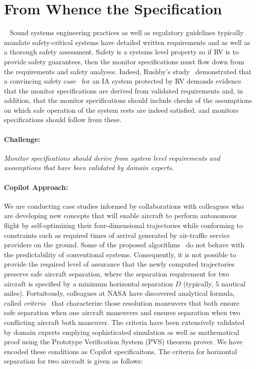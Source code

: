 \section{From Whence the Specification}~\label{sec:req}
Sound systems engineering practices  as well
as regulatory guidelines typically mandate safety-critical systems
have detailed written requirements and as well as a thorough safety
assessment. Safety is a systems level property so if RV is  to  provide safety guarantees,
then the  monitor specifications must flow down from the requirements
and safety analyses.   Indeed, Rushby's study~\cite{rvRushby,RushbyAIAA09} demonstrated
that  a convincing safety case~\cite{Kelly98arguingsafety} for an IA
system protected by RV  demands evidence that the
monitor specifications are  derived from validated requirements and, in
addition, that the monitor specifications should include checks of the assumptions on
which safe operation of the system rests  are indeed satisfied. 
and monitors specifications should follow from these.



\paragraph{Challenge:}   \emph{ Monitor specifications should derive from
  system level requirements and assumptions that have been validated
  by domain experts.} 

\paragraph{Copilot Approach:} We are conducting case studies informed
by collaborations with colleagues who are developing new concepts that
will enable aircraft to perform autonomous flight by self-optimizing
their four-dimensional trajectories while conforming to constraints
such as required times of arrival generated by air-traffic service
providers on the ground. Some of the proposed 
algorithms~\cite{KarrVRC} do not  behave with the
predictability of conventional systems.   Consequently, it is not 
possible to provide the required level of assurance that the newly
computed trajectories preserve safe aircraft separation, where the
separation requirement for two aircraft is specified by a minimum
horizontal separation $D$ (typically, $5$ nautical miles).  
Fortuitously, colleagues at NASA have discovered analytical formula,
called \emph{criteria}~\cite{NM2011NASA,NMH14ATIO} that characterize
those resolution maneuvers that both ensure safe separation when one
aircraft maneuvers and ensures separation when two conflicting
aircraft both maneuver. The criteria  have been
extensively validated by domain experts emplying sophisticated
simulation as well as mathematical proof using the Prototype
Verification System (PVS) theorem prover. We have encoded
these conditions as Copilot specificaitons. The criteria for horizontal separation for
two aircradt is given as follows:

